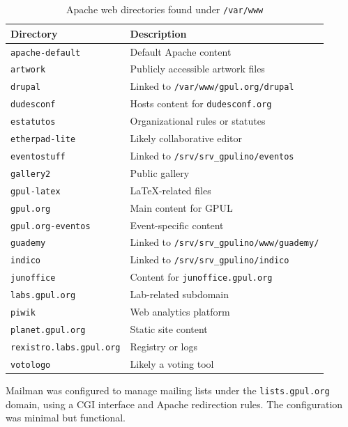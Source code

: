 \begin{table}[H]
  \centering
  \caption{Apache web directories found under \texttt{/var/www}}
  \label{tab:gpulino_www_dirs}
  \begin{tabular}{ll}
    \rowcolor{udcpink!25}
    \textbf{Directory} & \textbf{Description} \\
    \hline
    \texttt{apache-default} & Default Apache content \\
    \texttt{artwork} & Publicly accessible artwork files \\
    \texttt{drupal} & Linked to \texttt{/var/www/gpul.org/drupal} \\
    \texttt{dudesconf} & Hosts content for \texttt{dudesconf.org} \\
    \texttt{estatutos} & Organizational rules or statutes \\
    \texttt{etherpad-lite} & Likely collaborative editor \\
    \texttt{eventostuff} & Linked to \verb|/srv/srv_gpulino/eventos| \\
    \texttt{gallery2} & Public gallery \\
    \texttt{gpul-latex} & LaTeX-related files \\
    \texttt{gpul.org} & Main content for GPUL \\
    \texttt{gpul.org-eventos} & Event-specific content \\
    \texttt{guademy} & Linked to \verb|/srv/srv_gpulino/www/guademy/| \\
    \texttt{indico} & Linked to \verb|/srv/srv_gpulino/indico| \\
    \texttt{junoffice} & Content for \texttt{junoffice.gpul.org} \\
    \texttt{labs.gpul.org} & Lab-related subdomain \\
    \texttt{piwik} & Web analytics platform \\
    \texttt{planet.gpul.org} & Static site content \\
    \texttt{rexistro.labs.gpul.org} & Registry or logs \\
    \texttt{votologo} & Likely a voting tool \\
  \end{tabular}
\end{table}

Mailman was configured to manage mailing lists under the \texttt{lists.gpul.org} domain, using a CGI interface and Apache redirection rules. The configuration was minimal but functional.


